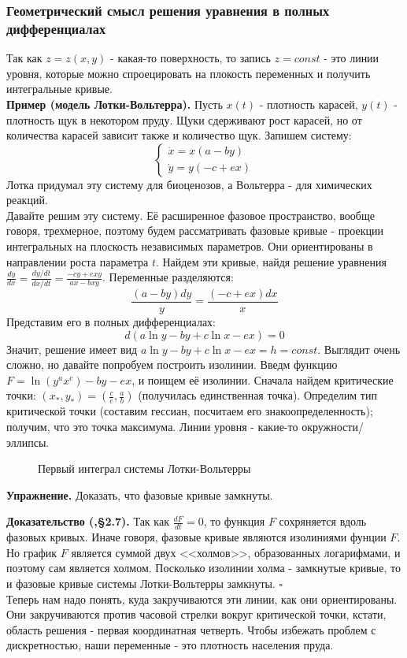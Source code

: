 \subsubsection{Геометрический смысл решения уравнения в полных дифференциалах}
Так как $z=z(x,y)$ - какая-то поверхность, то запись  $z=const$ - это линии
уровня, которые можно спроецировать на плокость переменных и получить 
интегральные кривые.\\
\textbf{Пример (модель Лотки-Вольтерра).} Пусть $x(t)$ - плотность карасей,
 $y(t)$ - плотность щук в некотором пруду. Щуки сдерживают рост карасей,
но от количества карасей зависит также и количество щук. Запишем систему:
$$\begin{cases} \label{lotka_volterra}
    \dot{x}=x(a-by)\\
    \dot{y}=y(-c+ex)
\end{cases}$$
Лотка придумал эту систему для биоценозов, а Вольтерра - для химических
реакций.\\
Давайте решим эту систему. Её расширенное фазовое пространство, вообще говоря,
трехмерное, поэтому будем рассматривать фазовые кривые - проекции интегральных 
на плоскость независимых параметров. Они ориентированы в направлении роста
параметра $t$. Найдем эти кривые, найдя решение уравнения 
$\frac{dy}{dx}=\frac{dy /dt}{dx /dt}=\frac{-cy+exy}{ax-bxy}$. 
Переменные разделяются: $$\frac{(a-by)dy}{y}=\frac{(-c+ex)dx}{x}$$ 
Представим его в полных дифференциалах: 
$$d\left( a\ln y-by+c\ln x -ex \right)=0$$
Значит, решение имеет вид $a\ln y-by+c\ln x-ex=h=const$.
Выглядит очень сложно, но давайте попробуем построить изолинии. 
Введм функцию $F=\ln{(y^ax^c)}-by-ex$, и поищем её изолинии. Сначала найдем
критические точки: $(x_*,y_*)=(\frac{c}{e},\frac{a}{b})$ (получилась 
единственная точка). Определим тип критической точки (составим гессиан, 
посчитаем его знакоопределенность); получим, что это точка максимума.
Линии уровня - какие-то окружности/эллипсы.\\
\begin{figure}[H]
    \centering
    \caption{Первый интеграл системы Лотки-Вольтерры}
    \label{fig:}
\end{figure}
\textbf{Упражнение.} Доказать, что фазовые кривые замкнуты.

\textbf{Доказательство (\cite{Arnold},\S 2.7).} Так как 
$\frac{dF}{dt} = 0$, то функция $F$ сохряняется вдоль фазовых кривых. 
Иначе говоря, фазовые кривые являются изолиниями фунции $F$. Но 
график  $F$ является суммой двух <<холмов>>, образованных логарифмами, 
и поэтому сам является холмом. Посколько изолинии холма - замкнутые кривые,
то и фазовые кривые системы Лотки-Вольтерры замкнуты. $\square$\\
Теперь нам надо понять, куда закручиваются эти линии, как они ориентированы.
Они закручиваются против часовой стрелки вокруг критической точки, кстати,
область решения - первая координатная четверть. Чтобы избежать проблем с 
дискретностью, наши переменные - это плотность населения пруда. 

